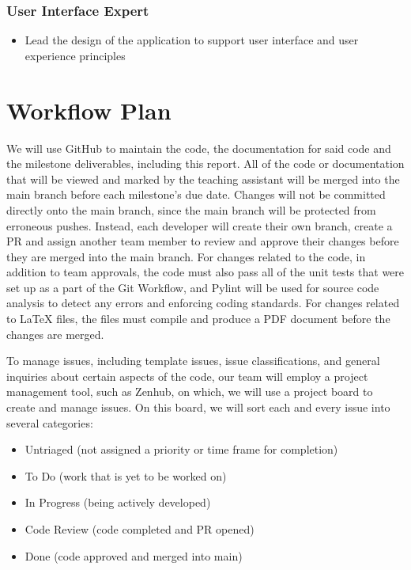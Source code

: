 \documentclass[12pt,letterpaper]{article}
\begin{document}
\subsubsection{User Interface Expert}
\begin{itemize}
    \item Lead the design of the application to support user interface and user
    experience principles
\end{itemize}


\section{Workflow Plan}
\label{workflowPlan}
We will use GitHub to maintain the code, the documentation for said code and the
milestone deliverables, including this report. All of the code or documentation
that will be viewed and marked by the teaching assistant will be merged into the
main branch before each milestone's due date. Changes will not be committed
directly onto the main branch, since the main branch will be protected from
erroneous pushes. Instead, each developer will create their own branch, create a
PR and assign another team member to review and approve their changes before
they are merged into the main branch. For changes related to the code, in
addition to team approvals, the code must also pass all of the unit tests that
were set up as a part of the Git Workflow, and Pylint will be used for source
code analysis to detect any errors and enforcing coding standards. For changes
related to LaTeX files, the files must compile and produce a PDF document before
the changes are merged. 

To manage issues, including template issues, issue classifications, and general
inquiries about certain aspects of the code, our team will employ a project
management tool, such as Zenhub, on which, we will use a project board to create
and manage issues. On this board, we will sort each and every issue into several
categories:
\begin{itemize}
    \item Untriaged (not assigned a priority or time frame for completion) \item
    To Do (work that is yet to be worked on)
    \item In Progress (being actively developed)
    \item Code Review (code completed and PR opened)
    \item Done (code approved and merged into main)
\end{itemize}
\end{document}
